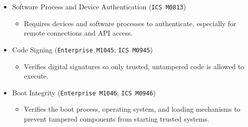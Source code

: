 \documentclass[10pt,a4paper,oneside]{report}
\begin{document}
\begin{itemize}
\begin{itemize}
\begin{itemize}
\end{itemize}
\item Software Process and Device Authentication (\texttt{ICS M0813})
\begin{itemize}
\item Requires devices and software processes to authenticate, especially for remote connections and API access.
\end{itemize}
\item Code Signing (\texttt{Enterprise M1045}; \texttt{ICS M0945})
\begin{itemize}
\item Verifies digital signatures so only trusted, untampered code is allowed to execute.
\end{itemize}
\item Boot Integrity (\texttt{Enterprise M1046}; \texttt{ICS M0946})
\begin{itemize}
\item Verifies the boot process, operating system, and loading mechanisms to prevent tampered components from starting trusted systems.
\end{itemize}
\end{itemize}
\end{itemize}
\end{document}
